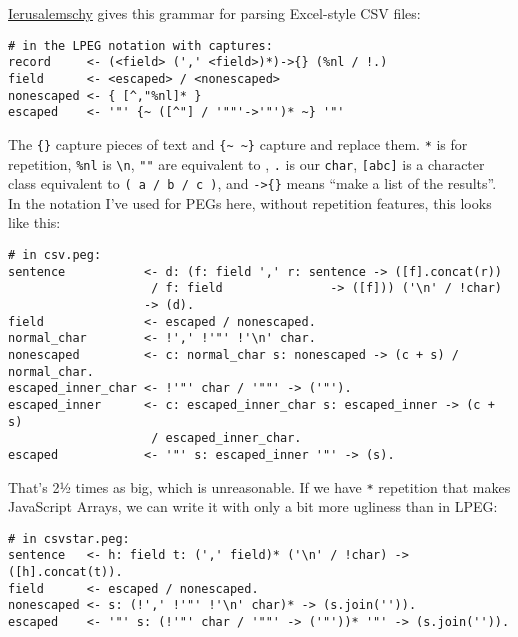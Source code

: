 \documentclass[
]{article}
\begin{document}
\href{http://www.inf.puc-rio.br/~roberto/docs/peg.pdf}{Ierusalemschy}
gives this grammar for parsing Excel-style CSV files:

\begin{verbatim}
# in the LPEG notation with captures:
record     <- (<field> (',' <field>)*)->{} (%nl / !.)
field      <- <escaped> / <nonescaped>
nonescaped <- { [^,"%nl]* }
escaped    <- '"' {~ ([^"] / '""'->'"')* ~} '"'
\end{verbatim}

The \texttt{\{\}} capture pieces of text and
\texttt{\{\textasciitilde{}\ \textasciitilde{}\}} capture and replace
them. \texttt{*} is for repetition, \texttt{\%nl} is
\texttt{\textquotesingle{}\textbackslash{}n\textquotesingle{}},
\texttt{""} are equivalent to
\texttt{\textquotesingle{}\textquotesingle{}}, \texttt{.} is our
\texttt{char}, \texttt{{[}abc{]}} is a character class equivalent to
\texttt{(\ \textquotesingle{}a\textquotesingle{}\ /\ \textquotesingle{}b\textquotesingle{}\ /\ \textquotesingle{}c\textquotesingle{}\ )},
and \texttt{-\textgreater{}\{\}} means ``make a list of the results''.
In the notation I've used for PEGs here, without repetition features,
this looks like this:

\begin{verbatim}
# in csv.peg:
sentence           <- d: (f: field ',' r: sentence -> ([f].concat(r)) 
                    / f: field               -> ([f])) ('\n' / !char)
                   -> (d).
field              <- escaped / nonescaped.
normal_char        <- !',' !'"' !'\n' char.
nonescaped         <- c: normal_char s: nonescaped -> (c + s) / normal_char.
escaped_inner_char <- !'"' char / '""' -> ('"').
escaped_inner      <- c: escaped_inner_char s: escaped_inner -> (c + s) 
                    / escaped_inner_char.
escaped            <- '"' s: escaped_inner '"' -> (s).
\end{verbatim}

That's 2½ times as big, which is unreasonable. If we have \texttt{*}
repetition that makes JavaScript Arrays, we can write it with only a bit
more ugliness than in LPEG:

\begin{verbatim}
# in csvstar.peg:
sentence   <- h: field t: (',' field)* ('\n' / !char) -> ([h].concat(t)).
field      <- escaped / nonescaped.
nonescaped <- s: (!',' !'"' !'\n' char)* -> (s.join('')).
escaped    <- '"' s: (!'"' char / '""' -> ('"'))* '"' -> (s.join('')).
\end{verbatim}
\end{document}
